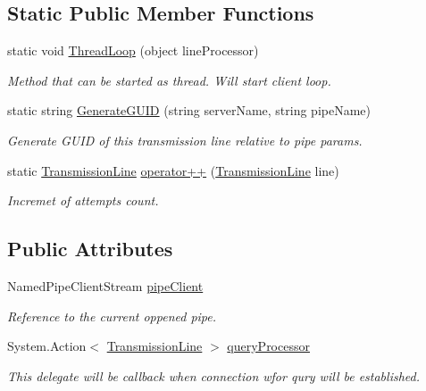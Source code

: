 \subsection*{Static Public Member Functions}
\begin{DoxyCompactItemize}
\item 
static void \mbox{\hyperlink{class_pipes_provider_1_1_transmission_line_ab56219b10bad03085b5d23e48ad59ec3}{Thread\+Loop}} (object line\+Processor)
\begin{DoxyCompactList}\small\item\em Method that can be started as thread. Will start client loop. \end{DoxyCompactList}\item 
static string \mbox{\hyperlink{class_pipes_provider_1_1_transmission_line_a1d9e1c1ba799548f3723e31cf5eece6e}{Generate\+G\+U\+ID}} (string server\+Name, string pipe\+Name)
\begin{DoxyCompactList}\small\item\em Generate G\+U\+ID of this transmission line relative to pipe params. \end{DoxyCompactList}\item 
static \mbox{\hyperlink{class_pipes_provider_1_1_transmission_line}{Transmission\+Line}} \mbox{\hyperlink{class_pipes_provider_1_1_transmission_line_ac3fe155028466c724c1efe9abb4b1c02}{operator++}} (\mbox{\hyperlink{class_pipes_provider_1_1_transmission_line}{Transmission\+Line}} line)
\begin{DoxyCompactList}\small\item\em Incremet of attempts count. \end{DoxyCompactList}\end{DoxyCompactItemize}
\subsection*{Public Attributes}
\begin{DoxyCompactItemize}
\item 
Named\+Pipe\+Client\+Stream \mbox{\hyperlink{class_pipes_provider_1_1_transmission_line_a31dff9b14126dc47bfafe65e3c976c2f}{pipe\+Client}}
\begin{DoxyCompactList}\small\item\em Reference to the current oppened pipe. \end{DoxyCompactList}\item 
System.\+Action$<$ \mbox{\hyperlink{class_pipes_provider_1_1_transmission_line}{Transmission\+Line}} $>$ \mbox{\hyperlink{class_pipes_provider_1_1_transmission_line_a08bf6cb803ea32dd416afcc12ee866f5}{query\+Processor}}
\begin{DoxyCompactList}\small\item\em This delegate will be callback when connection wfor qury will be established. \end{DoxyCompactList}\end{DoxyCompactItemize}
